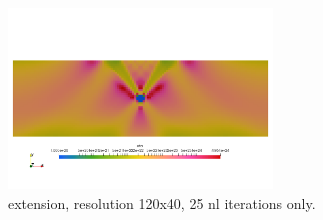 \begin{center}
\includegraphics[width=7cm]{python_codes/fieldstone_70/etaeff}\\
extension, resolution 120x40, 25 nl iterations only.
\end{center}




